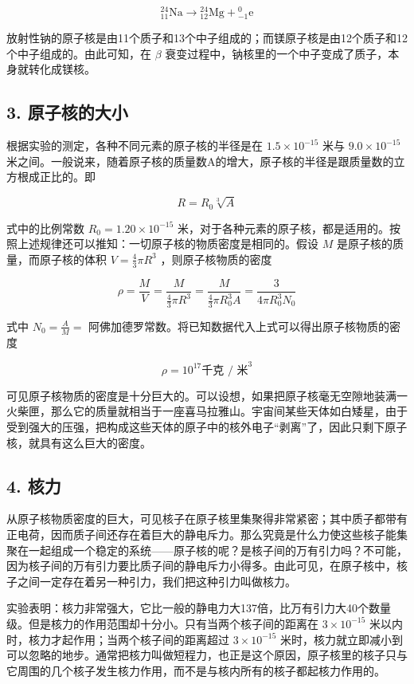\[
{} _ {11}^{24}\mathrm{Na}\longrightarrow {} _ {12}^{24}\mathrm{Mg}+{} _ {-1}^{0}\mathrm{e}
\]

放射性钠的原子核是由11个质子和13个中子组成的；而镁原子核是由12个质子和12个中子组成的。由此可知，在
\(\beta\) 衰变过程中，钠核里的一个中子变成了质子，本身就转化成镁核。

\subsection{3. 原子核的大小}

根据实验的测定，各种不同元素的原子核的半径是在 \(1.5\times10^{-15}\)
米与 \(9.0\times10^{-15}\)
米之间。一般说来，随着原子核的质量数A的增大，原子核的半径是跟质量数的立方根成正比的。即

\[
R = R _ {0} \sqrt [ 3 ]{A}
\]

式中的比例常数 \(R_0 = 1.20 \times 10^{-15}\)
米，对于各种元素的原子核，都是适用的。按照上述规律还可以推知：一切原子核的物质密度是相同的。假设
\(M\) 是原子核的质量，而原子核的体积 \(V = \frac{4}{3}\pi R^3\)
，则原子核物质的密度

\[
\rho = \frac {M}{V} = \frac {M}{\frac {4}{3} \pi R ^ {3}} = \frac {M}{\frac {4}{3} \pi R _ {0} ^ {3} A} = \frac {3}{4 \pi R _ {0} ^ {3} N _ {0}}
\]

式中 \(N_{0} = \frac{A}{M} =\)
阿佛加德罗常数。将已知数据代入上式可以得出原子核物质的密度

\[
\rho = 10 ^ {17} \text{千克 / 米} ^ {3}
\]

可见原子核物质的密度是十分巨大的。可以设想，如果把原子核毫无空隙地装满一火柴匣，那么它的质量就相当于一座喜马拉雅山。宇宙间某些天体如白矮星，由于受到强大的压强，把构成这些天体的原子中的核外电子``剥离''了，因此只剩下原子核，就具有这么巨大的密度。

\subsection{4. 核力}

从原子核物质密度的巨大，可见核子在原子核里集聚得非常紧密；其中质子都带有正电荷，因而质子间还存在着巨大的静电斥力。那么究竟是什么力使这些核子能集聚在一起组成一个稳定的系统------原子核的呢？是核子间的万有引力吗？不可能，因为核子间的万有引力要比质子间的静电斥力小得多。由此可见，在原子核中，核子之间一定存在着另一种引力，我们把这种引力叫做核力。

实验表明：核力非常强大，它比一般的静电力大137倍，比万有引力大40个数量级。但是核力的作用范围却十分小。只有当两个核子间的距离在
\(3\times10^{-15}\) 米以内时，核力才起作用；当两个核子间的距离超过
\(3\times10^{-15}\)
米时，核力就立即减小到可以忽略的地步。通常把核力叫做短程力，也正是这个原因，原子核里的核子只与它周围的几个核子发生核力作用，而不是与核内所有的核子都起核力作用的。

